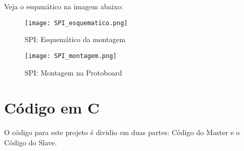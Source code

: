 Veja o esqumático na imagem abaixo: 

\begin{figure}[htb]
 \caption{SPI: Esquemático da montagem}
 \label{fig:SPI: Esquemático da montagem}
 \centering
 \texttt{[image: SPI\_esquematico.png]}
 \fautor
\end{figure}

\begin{figure}[htb]
 \caption{SPI: Montagem na Protoboard}
 \label{fig:SPI: Montagem na Protoboard}
 \centering
 \texttt{[image: SPI\_montagem.png]}
 \fautor
\end{figure}

\section{Código em C}

O código para este projeto é dividio em duas partes: Código do Master e o Código do Slave.

